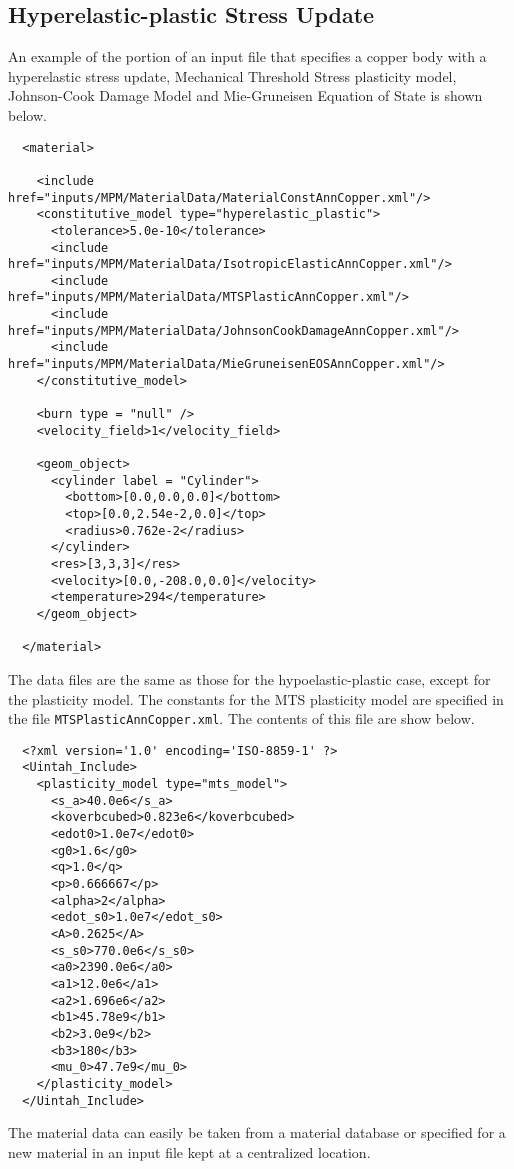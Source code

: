   \subsection{Hyperelastic-plastic Stress Update}
  An example of the portion of an input file that specifies a copper body
  with a hyperelastic stress update, Mechanical Threshold Stress plasticity model,
  Johnson-Cook Damage Model and Mie-Gruneisen Equation of State is shown 
  below.
  \begin{verbatim}
  <material>

    <include href="inputs/MPM/MaterialData/MaterialConstAnnCopper.xml"/>
    <constitutive_model type="hyperelastic_plastic">
      <tolerance>5.0e-10</tolerance>
      <include href="inputs/MPM/MaterialData/IsotropicElasticAnnCopper.xml"/>
      <include href="inputs/MPM/MaterialData/MTSPlasticAnnCopper.xml"/>
      <include href="inputs/MPM/MaterialData/JohnsonCookDamageAnnCopper.xml"/>
      <include href="inputs/MPM/MaterialData/MieGruneisenEOSAnnCopper.xml"/>
    </constitutive_model>

    <burn type = "null" />
    <velocity_field>1</velocity_field>

    <geom_object>
      <cylinder label = "Cylinder">
        <bottom>[0.0,0.0,0.0]</bottom>
        <top>[0.0,2.54e-2,0.0]</top>
        <radius>0.762e-2</radius>
      </cylinder>
      <res>[3,3,3]</res>
      <velocity>[0.0,-208.0,0.0]</velocity>
      <temperature>294</temperature>
    </geom_object>

  </material>
  \end{verbatim}

  The data files are the same as those for the hypoelastic-plastic case, 
  except for the plasticity model.  The constants for the MTS plasticity model
  are specified in the file \verb+MTSPlasticAnnCopper.xml+.  The contents
  of this file are show below.
  \begin{verbatim}
  <?xml version='1.0' encoding='ISO-8859-1' ?>
  <Uintah_Include>
    <plasticity_model type="mts_model">
      <s_a>40.0e6</s_a>
      <koverbcubed>0.823e6</koverbcubed>
      <edot0>1.0e7</edot0>
      <g0>1.6</g0>
      <q>1.0</q>
      <p>0.666667</p>
      <alpha>2</alpha>
      <edot_s0>1.0e7</edot_s0>
      <A>0.2625</A>
      <s_s0>770.0e6</s_s0>
      <a0>2390.0e6</a0>
      <a1>12.0e6</a1>
      <a2>1.696e6</a2>
      <b1>45.78e9</b1>
      <b2>3.0e9</b2>
      <b3>180</b3>
      <mu_0>47.7e9</mu_0>
    </plasticity_model>
  </Uintah_Include>
  \end{verbatim}

  The material data can easily be taken from a material database or specified
  for a new material in an input file kept at a centralized location.

  
  


